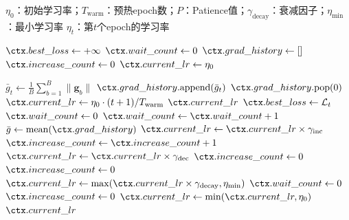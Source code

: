 \begin{algorithm}
  \centering
  \caption{动态学习率自适应调度算法}
  \label{alg:dynamic_lr}
  \small
  \begin{algorithmic}[1]
  \REQUIRE $\eta_0$：初始学习率；$T_{\text{warm}}$：预热epoch数；$P$：Patience值；$\gamma_{\text{decay}}$：衰减因子；$\eta_{\text{min}}$：最小学习率
  \ENSURE $\eta_t$：第$t$个epoch的学习率

  \STATE {}
  \STATE $\ctx.best\_loss \leftarrow +\infty$
  \STATE $\ctx.wait\_count \leftarrow 0$
  \STATE $\ctx.grad\_history \leftarrow []$
  \STATE $\ctx.increase\_count \leftarrow 0$
  \STATE $\ctx.current\_lr \leftarrow \eta_0$

  \STATE {}
    \STATE {}
    \STATE $\bar{g}_t \leftarrow \frac{1}{B} \sum_{b=1}^{B} \|\mathbf{g}_b\|$
    \STATE $\ctx.grad\_history.\text{append}(\bar{g}_t)$
    \STATE {}
      \STATE $\ctx.grad\_history.\text{pop}(0)$
    \ENDIF
    \STATE {}
      \STATE $\ctx.current\_lr \leftarrow \eta_0 \cdot (t + 1) / T_{\text{warm}}$
      \RETURN $\ctx.current\_lr$
    \ENDIF
    \STATE {}
      \STATE $\ctx.best\_loss \leftarrow \mathcal{L}_t$
      \STATE $\ctx.wait\_count \leftarrow 0$
    \ELSE
      \STATE $\ctx.wait\_count \leftarrow \ctx.wait\_count + 1$
    \ENDIF
    \STATE {}
      \STATE $\bar{g} \leftarrow \text{mean}(\ctx.grad\_history)$
        \STATE $\ctx.current\_lr \leftarrow \ctx.current\_lr \times \gamma_{\text{inc}}$
        \STATE $\ctx.increase\_count \leftarrow \ctx.increase\_count + 1$
        \STATE $\ctx.current\_lr \leftarrow \ctx.current\_lr \times \gamma_{\text{dec}}$
        \STATE $\ctx.increase\_count \leftarrow 0$
      \ELSE
        \STATE $\ctx.increase\_count \leftarrow 0$
      \ENDIF
    \ENDIF
    \STATE {}
      \STATE $\ctx.current\_lr \leftarrow \max(\ctx.current\_lr \times \gamma_{\text{decay}}, \eta_{\text{min}})$
      \STATE $\ctx.wait\_count \leftarrow 0$
      \STATE $\ctx.increase\_count \leftarrow 0$
    \ENDIF
    \STATE {}
    \STATE $\ctx.current\_lr \leftarrow \min(\ctx.current\_lr, \eta_0)$
    \RETURN $\ctx.current\_lr$
  \ENDFOR
  \end{algorithmic}
\end{algorithm}


